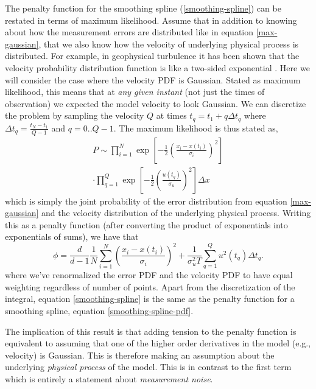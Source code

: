 \documentclass[10pt,journal]{IEEEtran}
\begin{document}
The penalty function for the smoothing spline (\ref{smoothing-spline}) can be restated in terms of maximum likelihood. Assume that in addition to knowing about how the measurement errors are distributed like in equation \ref{max-gaussian}, that we also know how the velocity of underlying physical process is distributed. For example, in geophysical turbulence it has been shown that the velocity probability distribution function is like a two-sided exponential \cite{bracco2000-pf}. Here we will consider the case where the velocity PDF is Gaussian. Stated as maximum likelihood, this means that at \emph{any given instant} (not just the times of observation) we expected the model velocity to look Gaussian. We can discretize the problem by sampling the velocity $Q$ at times $t_q = t_1 + q \Delta t_q$ where $\Delta t_q=\frac{t_N-t_1}{Q-1}$ and $q=0..Q-1$. The maximum likelihood is thus stated as,
\begin{equation}
\label{gaussian-max-likelihood}
\begin{split}
P \sim \prod^N _{i=1}\exp \left[ -\frac{1}{2} \left( \frac{x_i - x(t_i)}{\sigma_i} \right)^2 \right] \\\cdot \prod^{Q}_{q=1} \exp \left[  - \frac{1}{2} \left(  \frac{u(t_q)}{\sigma_u} \right)^2 \right] \Delta x
\end{split}
\end{equation}
which is simply the joint probability of the error distribution from equation \ref{max-gaussian} and the velocity distribution of the underlying physical process. Writing this as a penalty function (after converting the product of exponentials into exponentials of sums), we have that
\begin{equation}
\label{smoothing-spline-pdf}
\phi =\frac{d}{d-1}  \frac{1}{N} \sum^N _{i=1}  \left( \frac{x_i - x(t_i)}{\sigma_i} \right)^2 + \frac{1}{\sigma_u^2 T} \sum^{Q}_{q=1}  u^2(t_q) \Delta t_q.
\end{equation}
where we've renormalized the error PDF and the velocity PDF to have equal weighting regardless of number of points. Apart from the discretization of the integral, equation \ref{smoothing-spline} is the same as the penalty function for a smoothing spline, equation \ref{smoothing-spline-pdf}.

The implication of this result is that adding tension to the penalty function is equivalent to assuming that one of the higher order derivatives in the model (e.g., velocity) is Gaussian. This is therefore making an assumption about the underlying \emph{physical process} of the model. This is in contrast to the first term which is entirely a statement about \emph{measurement noise}.
\end{document}
